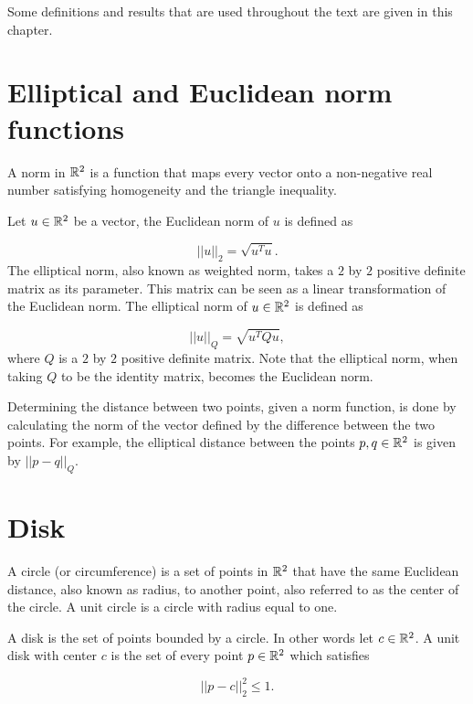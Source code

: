 Some definitions and results that are used throughout the text are given in this chapter.

\section{Elliptical and Euclidean norm functions}

A norm in $\mathbb{R}^2$ is a function that maps every vector onto a non-negative real number satisfying homogeneity and the triangle inequality. 

Let $u \in \mathbb{R}^2$ be a vector, the Euclidean norm of $u$ is defined as

\begin{equation*}
||u||_2 = \sqrt{u^{T}u}.
\end{equation*}
The elliptical norm, also known as weighted norm, takes a $2$ by $2$ positive definite matrix as its parameter. This matrix can be seen as a linear transformation of the Euclidean norm. The elliptical norm of $u \in\mathbb{R}^2$ is defined as 

\begin{equation*}
||u||_{Q} = \sqrt{u^{T}Qu},
\end{equation*}
where $Q$ is a $2$ by $2$ positive definite matrix. Note that the elliptical norm, when taking $Q$ to be the identity matrix, becomes the Euclidean norm.

Determining the distance between two points, given a norm function, is done by calculating the norm of the vector defined by the difference between the two points. For example, the elliptical distance between the points $p,q \in \mathbb{R}^2$ is given by $||p-q||_{Q}$.

\section{Disk}

A circle (or circumference) is a set of points in $\mathbb{R}^2$ that have the same Euclidean distance, also known as radius, to another point, also referred to as the center of the circle. A unit circle is a circle with radius equal to one.

A disk is the set of points bounded by a circle. In other words let $c \in \mathbb{R}^2$. A unit disk with center $c$ is the set of every point $p \in \mathbb{R}^2$ which satisfies

\begin{equation}\label{eq:disk}
||p-c||_2^2 \le 1.
\end{equation} 

